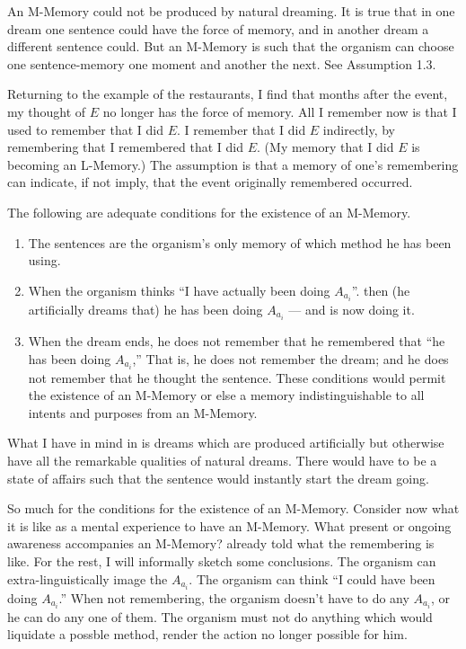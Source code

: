 \begin{hangers}
 An M-Memory could not be produced by natural 
dreaming. It is true that in one dream one sentence could have the force of 
memory, and in another dream a different sentence could. But an M-Memory 
is such that the organism can choose one sentence-memory one moment and 
another the next. See Assumption 1.3. 

 Returning to the example of the restaurants, I find 
that months after the event, my thought of $E$ no longer has the force of 
memory. All I remember now is that I used to remember that I did $E$. I 
remember that I did $E$ indirectly, by remembering that I remembered that I 
did $E$. (My memory that I did $E$ is becoming an L-Memory.) The assumption 
is that a memory of one's remembering can indicate, if not imply, that the 
event originally remembered occurred. 

 The following are adequate conditions for the existence 
of an M-Memory. 
\begin{enumerate}
\item The sentences are the organism's only memory of which 
method he has been using. 

\item When the organism thinks \enquote{I have actually been doing $A_{a_i}$}.
then (he artificially dreams that) he has been doing $A_{a_i}$ --- and is 
now doing it. 

\item When the dream ends, he does not remember that he 
remembered that \enquote{he has been doing $A_{a_i}$,} That is, he does not remember 
the dream; and he does not remember that he thought the sentence. These 
conditions would permit the existence of an M-Memory or else a memory 
indistinguishable to all intents and purposes from an M-Memory. 
\end{enumerate}
\end{hangers}

What I have in mind in  is dreams which are produced 
artificially but otherwise have all the remarkable qualities of natural dreams. 
There would have to be a state of affairs such that the sentence would 
instantly start the dream going. 

So much for the conditions for the existence of an M-Memory. 
Consider now what it is like as a mental experience to have an M-Memory. 
What present or ongoing awareness accompanies an M-Memory? 
 already told what the remembering is like. For the rest, I will 
informally sketch some conclusions. The organism can extra-linguistically 
image the $A_{a_i}$. The organism can think \enquote{I could have been doing $A_{a_i}$.} When 
not remembering, the organism doesn't have to do any $A_{a_i}$, or he can do any 
one of them. The organism must not do anything which would liquidate a 
possble method, render the action no longer possible for him. 

